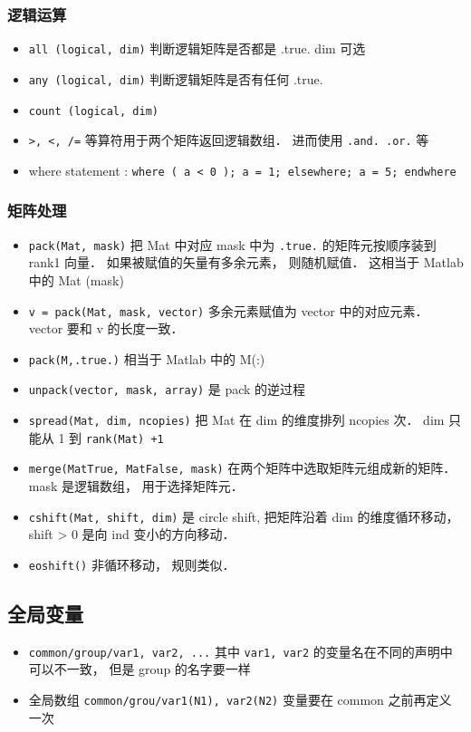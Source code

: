 \subsubsection{逻辑运算}
\begin{itemize}
\item \verb`all (logical, dim)` 判断逻辑矩阵是否都是 .true.  dim 可选
\item \verb`any (logical, dim)` 判断逻辑矩阵是否有任何 .true.
\item \verb`count (logical, dim) `
\item \verb`>, <, /=` 等算符用于两个矩阵返回逻辑数组． 进而使用 \verb`.and. .or.` 等
\item where statement : 
\verb`where ( a < 0 ); a = 1; elsewhere; a = 5; endwhere`
\end{itemize}

\subsubsection{矩阵处理}
\begin{itemize}
\item \verb`pack(Mat, mask)` 把 Mat 中对应 mask 中为 \verb|.true.| 的矩阵元按顺序装到 rank1 向量． 如果被赋值的矢量有多余元素， 则随机赋值． 这相当于 Matlab 中的 Mat (mask)
\item \verb`v = pack(Mat, mask, vector)` 多余元素赋值为 vector 中的对应元素． vector 要和 v 的长度一致．
\item \verb`pack(M,.true.)` 相当于 Matlab 中的 M(:)
\item \verb`unpack(vector, mask, array)` 是 pack 的逆过程
\item \verb`spread(Mat, dim, ncopies)` 把 Mat 在 dim 的维度排列 ncopies 次． dim 只能从 1 到 \verb`rank(Mat) +1`
\item \verb`merge(MatTrue, MatFalse, mask)` 在两个矩阵中选取矩阵元组成新的矩阵． mask 是逻辑数组， 用于选择矩阵元．
\item \verb`cshift(Mat, shift, dim)` 是 circle shift, 把矩阵沿着 dim 的维度循环移动， shift > 0 是向 ind 变小的方向移动．
\item \verb`eoshift()` 非循环移动， 规则类似．
\end{itemize}

\subsection{全局变量}
\begin{itemize}
\item \verb`common/group/var1, var2, ...` 其中 \verb|var1, var2| 的变量名在不同的声明中可以不一致， 但是 group 的名字要一样
\item 全局数组 \verb`common/grou/var1(N1), var2(N2)` 变量要在 common 之前再定义一次
\end{itemize}


